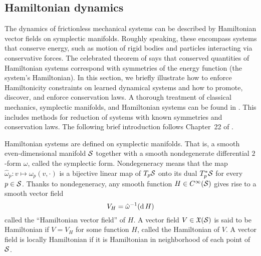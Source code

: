 \documentclass[twoside,11pt]{article}
\begin{document}
\subsection{Hamiltonian dynamics}
\label{subsec:Hamiltonian_conservation_laws}

The dynamics of frictionless mechanical systems can be described by Hamiltonian vector fields on symplectic manifolds.
Roughly speaking, these encompass systems that conserve energy, such as motion of rigid bodies and particles interacting via conservative forces.
The celebrated theorem of \cite{noether1918invariante} says that conserved quantities of Hamiltonian systems correspond with symmetries of the energy function (the system's Hamiltonian).
In this section, we briefly illustrate how to enforce Hamiltonicity constraints on learned dynamical systems and how to promote, discover, and enforce conservation laws.
A thorough treatment of classical mechanics, symplectic manifolds, and Hamiltonian systems can be found in \cite{Abraham2008foundations,Marsden:MS}.
This includes methods for reduction of systems with known symmetries and conservation laws.
The following brief introduction follows Chapter~22 of \cite{Lee2013introduction}.

Hamiltonian systems are defined on symplectic manifolds.
That is, a smooth even-dimensional manifold ${\mathcal{S}}$ together with a smooth nondegenerate differential $2$-form $\omega$, called the symplectic form.
Nondegeneracy means that the map $\hat{\omega}_p: v \mapsto \omega_p(v,\cdot)$ is a bijective linear map of $T_p {\mathcal{S}}$ onto its dual $T_p^* {\mathcal{S}}$ for every $p \in {\mathcal{S}}$.
Thanks to nondegeneracy, any smooth function $H \in C^{\infty}({\mathcal{S}})$ gives rise to a smooth vector field
\begin{equation}
    V_H = \hat{\omega}^{-1}(\operatorname{\mathrm{d}} H)
\end{equation}
called the ``Hamiltonian vector field'' of $H$.
A vector field $V \in \mathfrak{X}({\mathcal{S}})$ is said to be Hamiltonian if $V = V_H$ for some function $H$, called the Hamiltonian of $V$.
A vector field is locally Hamiltonian if it is Hamiltonian in neighborhood of each point of ${\mathcal{S}}$.
\end{document}
